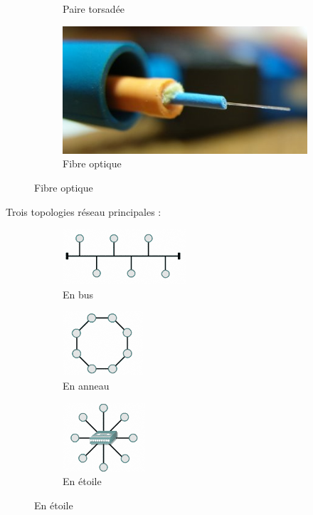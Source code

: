\documentclass{beamer}
\begin{document}
\begin{frame}[allowframebreaks]
\begin{figure}[h]
\begin{subfigure}[t]{0.33\textwidth}
        \caption{Paire torsadée}
    \end{subfigure}%
    \begin{subfigure}[t]{0.33\textwidth}
        \includegraphics[scale=0.3]{2-Fibre_optique}
        \caption{Fibre optique}
    \end{subfigure}
\end{figure}
\framebreak
  
Trois topologies réseau principales :
\begin{figure}[h]
    \begin{subfigure}[t]{0.33\textwidth}
        \includegraphics[scale=0.5]{2-Bus}
        \caption{En bus} 
    \end{subfigure}%
    \begin{subfigure}[t]{0.33\textwidth}
        \includegraphics[scale=0.6]{2-Anneau}
        \caption{En anneau}
    \end{subfigure}%
    \begin{subfigure}[t]{0.33\textwidth}
        \includegraphics[scale=0.6]{2-Etoile}
        \caption{En étoile}
    \end{subfigure}
\end{figure}
\framebreak


\end{frame}
\end{document}
